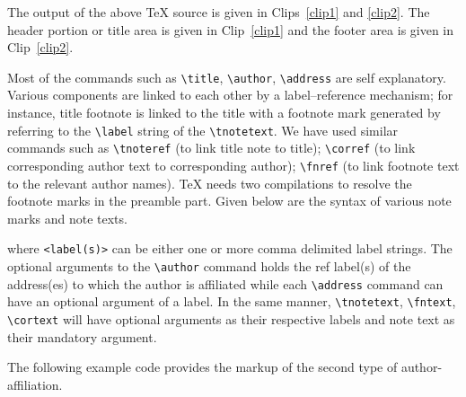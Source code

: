 \documentclass[a4paper,12pt]{article}
\begin{document}
The output of the above \TeX{} source is given in Clips~\ref{clip1} and
\ref{clip2}. The header portion or title area is given in
Clip~\ref{clip1} and the footer area is given in Clip~\ref{clip2}.

\def\rulecolor{blue!70}
\def\rulecolor{orange}

\def\rulecolor{blue!70}
\def\rulecolor{orange}

Most of the commands such as \verb+\title+, \verb+\author+,
\verb+\address+ are self explanatory.  Various components are
linked to each other by a label--reference mechanism; for
instance, title footnote is linked to the title with a footnote
mark generated by referring to the \verb+\label+ string of
the \verb=\tnotetext=.  We have used similar commands
such as \verb=\tnoteref= (to link title note to title);
\verb=\corref= (to link corresponding author text to
corresponding author); \verb=\fnref= (to link footnote text to
the relevant author names).  \TeX{} needs two compilations to
resolve the footnote marks in the preamble part.  
Given below are the syntax of various note marks and note texts.


\begin{vquote}
\end{vquote}

\noindent where \verb=<label(s)>= can be either one or more comma
delimited label strings. The optional arguments to the
\verb=\author= command holds the ref label(s) of the address(es)
to which the author is affiliated while each \verb=\address=
command can have an optional argument of a label. In the same
manner, \verb=\tnotetext=, \verb=\fntext=, \verb=\cortext= will
have optional arguments as their respective labels and note text
as their mandatory argument.

The following example code provides the markup of the second type
of author-affiliation.

\begin{vquote}
\author{Jos Migchielsen%
  }
 \address{Elsevier B.V., Radarweg 29, 1043 NX Amsterdam, 
          The Netherlands}

\author{CV Radhakrishnan}
 \address{Sayahna Foundations, JWRA 34, Jagathy, 
    Trivandrum 695014, India}

\author{CV Rajagopal}
  \address{STM Document Engineering Pvt Ltd., Mepukada,
    Malayinkil, Trivandrum 695571, India}
\end{vquote}
\end{document}
